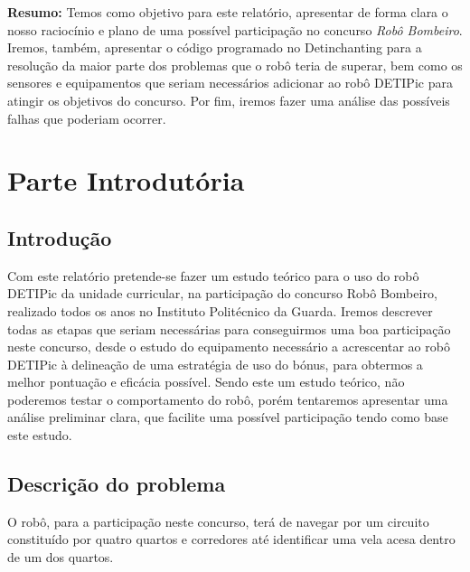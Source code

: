 \documentclass[pdftex,12pt,a4paper]{report}
\begin{document}
 

\renewcommand{\headrulewidth}{0pt}

\vspace*{\fill}
\textbf{Resumo:}
\begingroup
Temos como objetivo para este relatório, apresentar de forma clara o nosso raciocínio e plano de uma possível participação no concurso \emph{Robô Bombeiro}. Iremos, também, apresentar o código programado no Detinchanting para a resolução da maior parte dos problemas que o robô teria de superar, bem como os sensores e equipamentos que seriam necessários adicionar ao robô DETIPic para atingir os objetivos do concurso. Por fim, iremos fazer uma análise das possíveis falhas que poderiam ocorrer.
\endgroup
\vspace*{\fill}
\newpage

\renewcommand*\contentsname{Conteúdos}
\renewcommand*\figurename{Figura}

\tableofcontents
\renewcommand{\headrulewidth}{0.15pt}
\renewcommand{\thechapter}{}

\clearpage

\section{Parte Introdutória}

\subsection{Introdução} 
Com este relatório pretende-se fazer um estudo teórico para o uso do robô DETIPic da unidade curricular, na participação do concurso Robô Bombeiro, realizado todos os anos no Instituto Politécnico da Guarda. Iremos descrever todas as etapas que seriam necessárias para conseguirmos uma boa participação neste concurso, desde o estudo do equipamento necessário a acrescentar ao robô DETIPic à delineação de uma estratégia de uso do bónus, para obtermos a melhor pontuação e eficácia possível. Sendo este um estudo teórico, não poderemos testar o comportamento do robô, porém tentaremos apresentar uma análise preliminar clara, que facilite uma possível participação tendo como base este estudo.

\subsection{Descrição do problema}
O robô, para a participação neste concurso, terá de navegar por um circuito constituído por quatro quartos e corredores até identificar uma vela acesa dentro de um dos quartos. 
\end{document}
